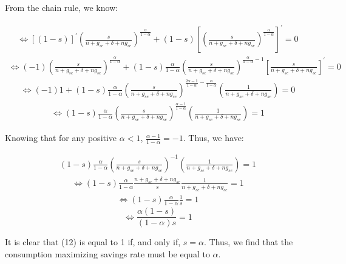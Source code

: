 \documentclass[11pt]{article} %
\begin{document}
\bigskip\par From the chain rule, we know:

\begin{align*}
    \Longleftrightarrow 
    \left[(1-s)\right]^{'}\left(\frac{s}{n+g_{se}+\delta+ng_{se}}\right)^{\frac{\alpha}{1-\alpha}}
    +(1-s)\left[\left(\frac{s}{n+g_{se}+\delta+ng_{se}}\right)^{\frac{\alpha}{1-\alpha}}\right]^{'}
    =0
\end{align*}
\begin{align*}
    \Longleftrightarrow
    (-1) \left(\frac{s}{n+g_{se}+\delta+ng_{se}}\right)^{\frac{\alpha}{1-\alpha}}
    + (1-s) \frac{\alpha}{1-\alpha}\left(\frac{s}{n+g_{se}+\delta+ng_{se}}\right)^{\frac{\alpha}{1-\alpha}-1}\left[\frac{s}{n+g_{se}+\delta+ng_{se}}\right]^{'}
    =0
\end{align*}
\begin{align*}
    \Longleftrightarrow
    (-1)1
    + (1-s) \frac{\alpha}{1-\alpha}\left(\frac{s}{n+g_{se}+\delta+ng_{se}}\right)^{\frac{2\alpha-1}{1-\alpha}-\frac{\alpha}{1-\alpha}}\left(\frac{1}{n+g_{se}+\delta+ng_{se}}\right)
    =0
\end{align*}
\begin{align*}
    \Longleftrightarrow
    (1-s) \frac{\alpha}{1-\alpha}\left(\frac{s}{n+g_{se}+\delta+ng_{se}}\right)^{\frac{\alpha-1}{1-\alpha}}
    \left(\frac{1}{n+g_{se}+\delta+ng_{se}}\right)
    =1
\end{align*}

\bigskip\par Knowing that for any positive $\alpha < 1$, $\frac{\alpha-1}{1-\alpha} = -1$. Thus, we have:

\begin{align*}
    (1-s) \frac{\alpha}{1-\alpha}\left(\frac{s}{n+g_{se}+\delta+ng_{se}}\right)^{-1}
    \left(\frac{1}{n+g_{se}+\delta+ng_{se}}\right)
    =1
\end{align*}
\begin{align*}
    \Longleftrightarrow
    (1-s) \frac{\alpha}{1-\alpha}\frac{n+g_{se}+\delta+ng_{se}}{s}
    \frac{1}{n+g_{se}+\delta+ng_{se}}
    =1
\end{align*}
\begin{align*}
    \Longleftrightarrow
    (1-s) \frac{\alpha}{1-\alpha} \frac{1}{s}=1
\end{align*}
\begin{equation}
    \Longleftrightarrow
    \frac{\alpha(1-s)}{(1-\alpha)s}=1
\end{equation}

\bigskip \par It is clear that (12) is equal to 1 if, and only if, $s = \alpha$. Thus, we find that the consumption maximizing savings rate must be equal to $\alpha$.
\end{document}
